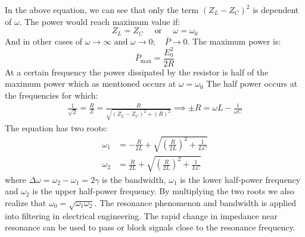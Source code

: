 In the above equation, we can see that only the term $(Z_L-Z_C)^2$ is dependent of $\omega$. The power would reach maximum value if: 
\[ Z_L=Z_C \quad \text{ or } \quad \omega = \omega _0\] 
And in other cases of $\omega \rightarrow \infty \text{ and } \omega \rightarrow 0; \quad \bar{P} \rightarrow 0$. The maximum power is:
\[
\bar{P}_{\max }=\frac{E_0^{2}}{2 R}
\]
At a certain frequency the power dissipated by the resistor is half of the maximum power which as mentioned occurs at \(\omega = \omega_{0}\) The half power occurs at the frequencies for which:
\begin{align*}
\frac{1}{\sqrt{2}}=\frac {R}{Z} = \frac{ R }{\sqrt{\left(Z_L - Z_C\right)^{2}+(R)^{2}}} 
\implies \pm R = \omega L - \frac{1}{\omega C}
\end{align*}
The equation has two roots: 
\begin{align*}
    \omega_{1} &=-\frac{R}{2 L}+\sqrt{\left(\frac{R}{2 L}\right)^{2}+\frac{1}{LC}} \\
    \omega_{2} &=\frac{R}{2 L}+\sqrt{\left(\frac{R}{2 L}\right)^{2}+\frac{1}{LC}}
\end{align*}
where \(\Delta \omega = \omega_{2} - \omega_{1} = 2\gamma\) is the bandwidth, \(\omega_{1}\) is the lower half-power frequency and \(\omega_{2}\) is the upper half-power frequency. By multiplying the two roots we also realize that $\omega_{0}=\sqrt{\omega_{1} \omega_{2}}$. \newline
The resonance phenomenon and bandwidth is applied into filtering in electrical engineering. The rapid change in impedance near resonance can be used to pass or block signals close to the resonance frequency.

